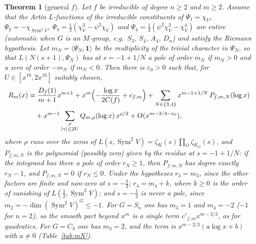 \documentclass[11pt,a4paper]{article}
\newtheorem{theorem}{Theorem}
\theoremstyle{remark}\newtheorem{remark}[theorem]{Remark}
\newcommand{\Sym}{\operatorname{Sym}}\newcommand{\Res}{\operatorname*{Res}}
\begin{document}
\begin{theorem}[general $f$]\label{thm:explicit-general}
Let $f$ be irreducible of degree $n\ge2$ and $m\ge2$. Assume that the Artin $L$-functions of the irreducible
constituents of $\Psi_1=\chi_V$, $\Psi_2=-\chi_{\Sym^2V}$, $\Psi_3=\tfrac13(\chi_V^3-\psi^3\chi_V)$ and
$\Psi_4=\tfrac14(\psi^2\chi_V^2-\chi_V^4)$ are entire
(automatic when $G$ is an $M$-group, e.g.\ $S_3$, $S_4$, $A_4$, $D_n$) and satisfy the Riemann hypothesis. Let
$m_N=\langle\Psi_N,\mathbf 1\rangle$ be the multiplicity of the trivial character in $\Psi_N$, so that
$L(N(s+1),\Psi_N)$ has at $s=-1+1/N$ a pole of order $m_N$ if $m_N>0$ and a zero of order $-m_N$ if $m_N<0$. Then
there is $\varepsilon_0>0$ such that, for $U\in[x^{16},2x^{16}]$ suitably chosen,
\[
\begin{aligned}
R_m(x)&=\frac{D_f(1)}{m+1}x^{m+1}+x^m\Bigl(-\frac{\log x}{2C(f)}+c_{f,m}\Bigr)+\sum_{N\in\{3,4\}}x^{m-1+1/N}\,P_{f,m,N}(\log x)\\
&\quad+x^{m-1}\sum_{\substack{\rho\\|\gamma|\le2U}}Q_{m,\rho}(\log x)\,x^{\rho/2}+O(x^{m-3/4-\varepsilon_0}),
\end{aligned}
\]
where $\rho$ runs over the zeros of $L(s,\Sym^2V)=\zeta_K(s)\prod_O\zeta_{K_O}(s)$, and $P_{f,m,N}$ is the polynomial
(possibly zero) given by the residue at $s=-1+1/N$: if the integrand has there a pole of order $r_N\ge1$, then
$P_{f,m,N}$ has degree exactly $r_N-1$, and $P_{f,m,N}=0$ if $r_N\le0$. Under the hypotheses $r_3=m_3$, since the
other factors are finite and non-zero at $s=-\tfrac23$; $r_4=m_4+k$, where $k\ge0$ is the order of vanishing of
$L(\tfrac12,\Sym^2V)$; and $s=-\tfrac12$ is never a pole, since $m_2=-\dim(\Sym^2V)^G\le-1$. For $G=S_n$ one has
$m_3=1$ and $m_4=-2$ ($-1$ for $n=2$), so the smooth part beyond $x^m$ is a single term $c'_{f,m}x^{m-2/3}$, as for
quadratics. For $G=C_3$ one has $m_3=2$, and the term is $x^{m-2/3}(a\log x+b)$ with $a\ne0$
(Table~\ref{tab:mN}).
\end{theorem}
\end{document}
